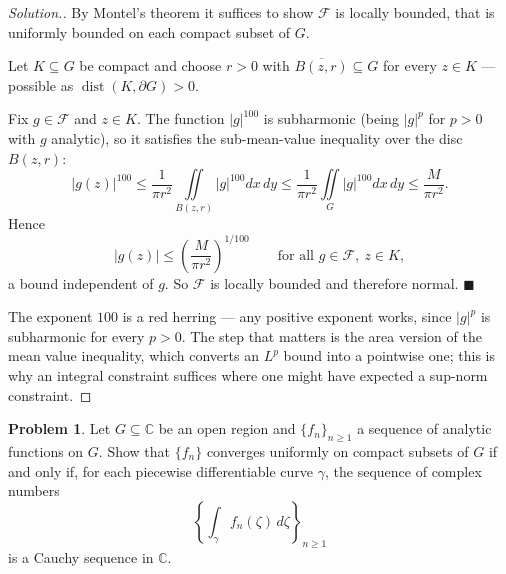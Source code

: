 \documentclass[11pt,a4paper]{article}
\theoremstyle{definition}
\newtheorem{problemx}{Problem}[section]
\newenvironment{problem}{\begin{problemx}}{\end{problemx}}
\newenvironment{solution}
  {\renewcommand{\qedsymbol}{}\begin{proof}[\textit{Solution}.]}
  {\end{proof}}
\begin{document}
\begin{solution}
By Montel's theorem it suffices to show $\mathcal{F}$ is locally bounded, that is
uniformly bounded on each compact subset of $G$.

Let $K \subseteq G$ be compact and choose $r > 0$ with
$\overline{B(z,r)} \subseteq G$ for every $z \in K$ --- possible as
$\operatorname{dist}(K,\partial G) > 0$.

Fix $g \in \mathcal{F}$ and $z \in K$. The function $\left|g\right|^{100}$ is
subharmonic (being $\left|g\right|^{p}$ for $p > 0$ with $g$ analytic), so it
satisfies the sub-mean-value inequality over the disc $B(z,r)$:
$$\left|g(z)\right|^{100}
\leq \frac{1}{\pi r^{2}}\iint\limits_{B(z,r)}\left|g\right|^{100}dx\,dy
\leq \frac{1}{\pi r^{2}}\iint\limits_{G}\left|g\right|^{100}dx\,dy
\leq \frac{M}{\pi r^{2}} .$$
Hence
$$\left|g(z)\right| \leq \left(\frac{M}{\pi r^{2}}\right)^{1/100}
\qquad\text{for all } g \in \mathcal{F},\ z \in K,$$
a bound independent of $g$. So $\mathcal{F}$ is locally bounded and therefore
normal. $\blacksquare$

The exponent $100$ is a red herring --- any positive exponent works, since
$\left|g\right|^{p}$ is subharmonic for every $p > 0$. The step that matters is the
area version of the mean value inequality, which converts an $L^{p}$ bound into a
pointwise one; this is why an integral constraint suffices where one might have
expected a sup-norm constraint.
\end{solution}


\begin{problem}
Let $G \subseteq \mathbb{C}$ be an open region and $\{f_n\}_{n \geq 1}$ a
sequence of analytic functions on $G$. Show that $\{f_n\}$ converges uniformly on
compact subsets of $G$ if and only if, for each piecewise differentiable curve
$\gamma$, the sequence of complex numbers
$$\left\{\int_{\gamma} f_n(\zeta)\,d\zeta\right\}_{n \geq 1}$$
is a Cauchy sequence in $\mathbb{C}$.
\end{problem}
\end{document}
